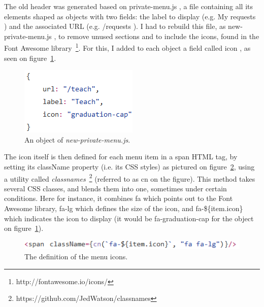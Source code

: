 The old header was generated based on \guillemotleft{} private-menu.js \guillemotright{}, a file containing all its elements shaped as objects with two fields: the label to display (e.g. \guillemotleft{} My requests \guillemotright{}) and the associated URL (e.g. \guillemotleft{} /requests \guillemotright{}). I had to rebuild this file, as \guillemotleft{} new-private-menu.js \guillemotright{}, to remove unused sections and to include the icons, found in the Font Awesome library~\footnote{http://fontawesome.io/icons/}. For this, I added to each object a field called \guillemotleft{} icon \guillemotright{}, as seen on {\sc figure}~\ref{fig:icon}. 

\begin{figure}[H]
    \centering
    \includegraphics[scale=0.9]{figure/icon.png}
    \caption{An object of \textit{new-private-menu.js}.}
    \label{fig:icon}
\end{figure}

The icon itself is then defined for each menu item in a span HTML tag, by setting its className property (i.e. its CSS styles) as pictured on {\sc figure}~\ref{fig:classnames}, using a utility called \textit{classnames}~\footnote{https://github.com/JedWatson/classnames} (referred to as \guillemotleft{} cn \guillemotright{} on the figure). This method takes several CSS classes, and blends them into one, sometimes under certain conditions. Here for instance, it combines \guillemotleft{} fa \guillemotright{} which points out to the Font Awesome library, \guillemotleft{} fa-lg \guillemotright{} which defines the size of the icon, and \guillemotleft{} fa-\$\{item.icon\} \guillemotright{} which indicates the icon to display (it would be \guillemotleft{} fa-graduation-cap \guillemotright{} for the object on {\sc figure}~\ref{fig:icon}). 

\begin{figure}[H]
    \centering
    \includegraphics[scale=0.9]{figure/classnames.png}
    \caption{The definition of the menu icons.}
    \label{fig:classnames}
\end{figure}

